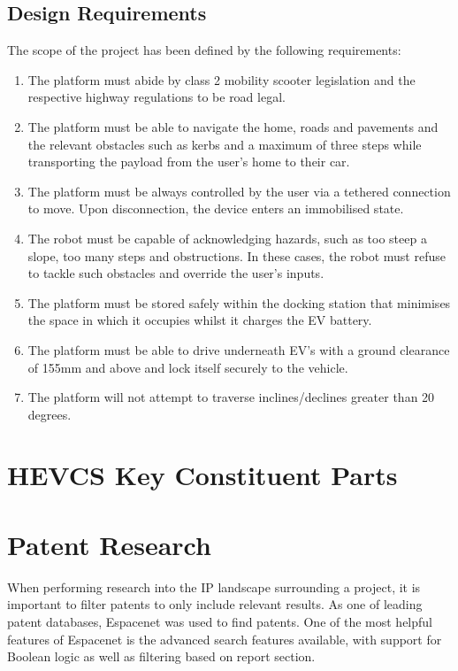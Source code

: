 \documentclass [12pt]{article}
\begin{document}
\subsection{Design Requirements}\label{sec:design_requirements}

The scope of the project has been defined by the following requirements:
\begin{enumerate}
    \item The platform must abide by class 2 mobility scooter legislation and the respective highway regulations to be road legal.
    \item The platform must be able to navigate the home, roads and pavements and the relevant obstacles such as kerbs and a maximum of three steps while transporting the payload from the user's home to their car.
    \item The platform must be always controlled by the user via a tethered connection to move. Upon disconnection, the device enters an immobilised state.
    \item The robot must be capable of acknowledging hazards, such as too steep a slope, too many steps and obstructions. In these cases, the robot must refuse to tackle such obstacles and override the user's inputs.
    \item The platform must be stored safely within the docking station that minimises the space in which it occupies whilst it charges the EV battery.
    \item The platform must be able to drive underneath EV's with a ground clearance of 155mm and above and lock itself securely to the vehicle.
    \item The platform will not attempt to traverse inclines/declines greater than 20 degrees.
  \end{enumerate}


\section{HEVCS Key Constituent Parts}\label{sec:constituent_parts}

\section{Patent Research}\label{sec:patent_research}
When performing research into the IP landscape surrounding a project, it is important to filter patents to only include relevant results. As one of leading patent databases, Espacenet was used to find patents. One of the most helpful features of Espacenet is the advanced search features available, with support for Boolean logic as well as filtering based on report section.
\end{document}
